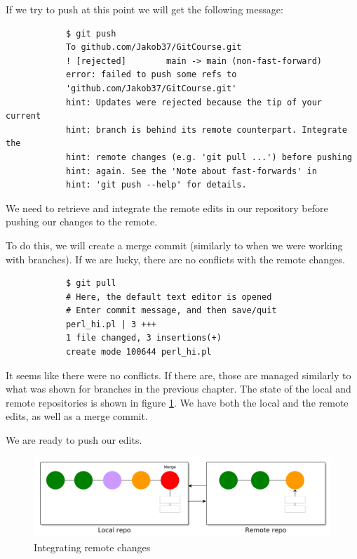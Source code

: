 \documentclass[../main/git_course_main.tex]{subfiles}
\begin{document}
	If we try to push at this point we will get the following message:
	
	\begin{codebox}
		\begin{lstlisting}
			$ git push
			To github.com/Jakob37/GitCourse.git
			! [rejected]        main -> main (non-fast-forward)
			error: failed to push some refs to 
			'github.com/Jakob37/GitCourse.git'
			hint: Updates were rejected because the tip of your current 
			hint: branch is behind its remote counterpart. Integrate the 
			hint: remote changes (e.g. 'git pull ...') before pushing 
			hint: again. See the 'Note about fast-forwards' in 
			hint: 'git push --help' for details.
		\end{lstlisting}
	\end{codebox}
	
	We need to retrieve and integrate the remote edits in our repository before pushing
	our changes to the remote.
	
	To do this, we will create a merge commit (similarly to when we were working with branches). If we are lucky, there are no conflicts with the remote changes.
	
	\begin{codebox}
		\begin{lstlisting}
			$ git pull
			# Here, the default text editor is opened
			# Enter commit message, and then save/quit
			perl_hi.pl | 3 +++
			1 file changed, 3 insertions(+)
			create mode 100644 perl_hi.pl
		\end{lstlisting}
	\end{codebox}
	
	It seems like there were no conflicts. If there are, those are managed similarly to what was shown for branches in the previous chapter. The state of the local and remote repositories is shown in figure \ref{fig:integrated_remote_changes}. We have both the local and the remote edits, as well as a merge commit.
	
	We are ready to push our edits.
	
	\begin{figure}[h!]
		\centering
		\includegraphics[width=1.0\textwidth]{../visualizations/chapter5/56_integrating_remote_changes.pdf}
		\caption{Integrating remote changes}
		\label{fig:integrated_remote_changes}
	\end{figure}
	
\end{document}
